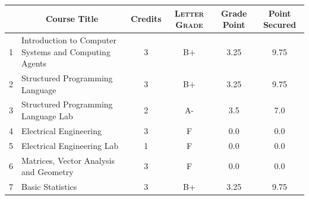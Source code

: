 \documentclass[11pt]{article}
\newcommand*{\numtwo}[1]{\pgfmathprintnumber[
                    fixed, precision=2, fixed zerofill=true]{#1}}
\begin{document}
                \begin{center}
                    \renewcommand{\arraystretch}{1.08}
                    
                \begin{tabular}{|c|l|c|>{\scshape}c|c|c|}
                \hline  \rule[-1ex]{0pt}{3.5ex} {\centering{\bf Course Code}} &  \multicolumn{1}{c|}{\textbf{Course Title}}  & {\bf Credits} & {\bf Letter Grade} & {\bf Grade Point} & {\bf Point Secured}  \\ 
                \hline   1 &  Introduction to Computer Systems and Computing Agents		 & 3 & B+ & 3.25 & 9.75 \\ %
                \hline   2 &  Structured Programming Language		 & 3 & B+ & 3.25 & 9.75 \\ %
                \hline   3 &  Structured Programming Language Lab		 & 2 & A- & 3.5 & 7.0 \\ %
                \hline   4 &  Electrical Engineering		 & 3 & F & 0.0 & 0.0 \\ %
                \hline   5 &  Electrical Engineering Lab		 & 1 & F & 0.0 & 0.0 \\ %
                \hline   6 &  Matrices, Vector Analysis and Geometry		 & 3 & F & 0.0 & 0.0 \\ %
                \hline   7 &  Basic Statistics		 & 3 & B+ & 3.25 & 9.75 \\ %

\hline                %
                \end{tabular}
                \end{center}
                \renewcommand{\arraystretch}{1.03}
\end{document}

